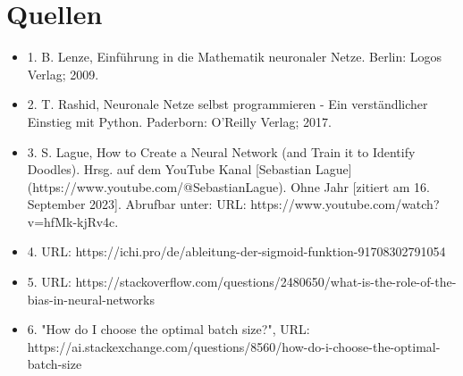 \documentclass[12pt]{article}
\begin{document}
\cleardoublepage
\section{ Quellen}
\begin{itemize}
\item 1. B. Lenze, Einführung in die Mathematik neuronaler Netze. Berlin: Logos Verlag; 2009.
\item 2. T. Rashid, Neuronale Netze selbst programmieren - Ein verständlicher Einstieg mit Python. Paderborn: O’Reilly Verlag; 2017.
\item 3. S. Lague, How to Create a Neural Network (and Train it to Identify Doodles). Hrsg. auf dem YouTube Kanal [Sebastian Lague](https://www.youtube.com/@SebastianLague). Ohne Jahr [zitiert am 16. September 2023]. Abrufbar unter: URL: https://www.youtube.com/watch?v=hfMk-kjRv4c.
\item 4. URL: https://ichi.pro/de/ableitung-der-sigmoid-funktion-91708302791054
\item 5. URL: https://stackoverflow.com/questions/2480650/what-is-the-role-of-the-bias-in-neural-networks
\item 6. "How do I choose the optimal batch size?", URL: https://ai.stackexchange.com/questions/8560/how-do-i-choose-the-optimal-batch-size
\end{itemize}

\cleardoublepage
{}
\listoffigures
\end{document}
